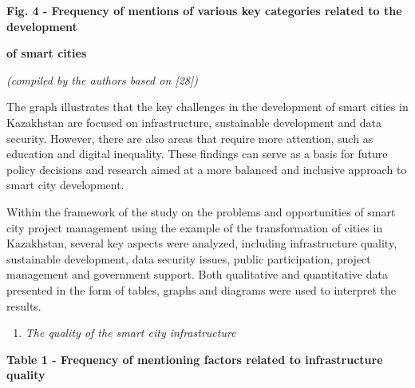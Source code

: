 {{\bfseries Fig. 4 - Frequency of mentions of various key categories related
to the development}

{\bfseries of smart cities}

\emph{(compiled by the authors based on {[}28{]})}

The graph illustrates that the key challenges in the development of
smart cities in Kazakhstan are focused on infrastructure, sustainable
development and data security. However, there are also areas that
require more attention, such as education and digital inequality. These
findings can serve as a basis for future policy decisions and research
aimed at a more balanced and inclusive approach to smart city
development.

Within the framework of the study on the problems and opportunities of
smart city project management using the example of the transformation of
cities in Kazakhstan, several key aspects were analyzed, including
infrastructure quality, sustainable development, data security issues,
public participation, project management and government support. Both
qualitative and quantitative data presented in the form of tables,
graphs and diagrams were used to interpret the results.

\begin{enumerate}
\def\labelenumi{\arabic{enumi}.}
\item
  \emph{The quality of the smart city infrastructure}
\end{enumerate}

{\bfseries Table 1 - Frequency of mentioning factors related to
infrastructure quality}


}
